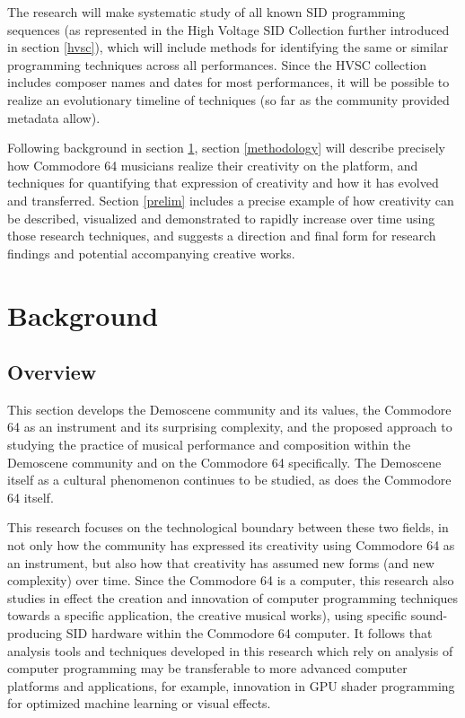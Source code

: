 \documentclass[10pt]{article}
\begin{document}
\begin{multicols*}{2}
The research will make systematic study of all known SID programming sequences (as represented in the High Voltage SID Collection\cite{hvsc} further introduced in section \ref{hvsc}), which will include methods for identifying the same or similar programming techniques across all performances. Since the HVSC collection includes composer names and dates for most performances, it will be possible to realize an evolutionary timeline of techniques (so far as the community provided metadata allow).

Following background in section \ref{background}, section \ref{methodology} will describe precisely how Commodore 64 musicians realize their creativity on the platform, and techniques for quantifying that expression of creativity and how it has evolved and transferred. Section \ref{prelim} includes a precise example of how creativity can be described, visualized and demonstrated to rapidly increase over time using those research techniques, and suggests a direction and final form for research findings and potential accompanying creative works.

  \section{Background}
  \label{background}

  \subsection{Overview}

This section develops the Demoscene community and its values, the Commodore 64 as an instrument and its surprising complexity, and the proposed approach to studying the practice of musical performance and composition within the Demoscene community and on the Commodore 64 specifically. The Demoscene itself as a cultural phenomenon continues to be studied, as does the Commodore 64 itself.

This research focuses on the technological boundary between these two fields, in not only how the community has expressed its creativity using Commodore 64 as an instrument, but also how that creativity has assumed new forms (and new complexity) over time. Since the Commodore 64 is a computer, this research also studies in effect the creation and innovation of computer programming techniques towards a specific application, the creative musical works), using specific sound-producing SID hardware within the Commodore 64 computer. It follows that analysis tools and techniques developed in this research which rely on analysis of computer programming may be transferable to more advanced computer platforms and applications, for example, innovation in GPU shader programming for optimized machine learning or visual effects\cite{10.1145/3534540.3534688}.


\end{multicols*}
\end{document}
